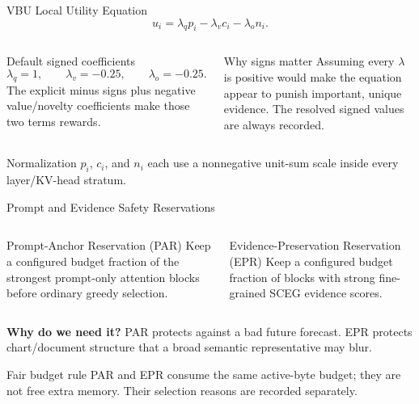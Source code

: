 \documentclass[aspectratio=169,10pt]{beamer}
\newcommand{\whylabel}{\textbf{Why do we need it?}}
\begin{document}
\begin{frame}{VBU Local Utility Equation}
\small
\[
u_i=\lambda_qp_i-\lambda_vc_i-\lambda_on_i.
\]
\begin{columns}[T,onlytextwidth]
\begin{block}{Default signed coefficients}
\[
\lambda_q=1,\qquad \lambda_v=-0.25,\qquad \lambda_o=-0.25.
\]
The explicit minus signs plus negative value/novelty coefficients make those two terms rewards.
\end{block}
\begin{alertblock}{Why signs matter}
Assuming every $\lambda$ is positive would make the equation appear to punish important, unique
evidence. The resolved signed values are always recorded.
\end{alertblock}
\end{columns}
\begin{exampleblock}{Normalization}
$p_i$, $c_i$, and $n_i$ each use a nonnegative unit-sum scale inside every layer/KV-head stratum.
\end{exampleblock}
\end{frame}

\begin{frame}{Prompt and Evidence Safety Reservations}
\small
\begin{columns}[T,onlytextwidth]
\begin{block}{Prompt-Anchor Reservation (PAR)}
Keep a configured budget fraction of the strongest prompt-only attention blocks before ordinary
greedy selection.
\end{block}
\begin{block}{Evidence-Preservation Reservation (EPR)}
Keep a configured budget fraction of blocks with strong fine-grained SCEG evidence scores.
\end{block}
\end{columns}
\begin{alertblock}{\whylabel}
PAR protects against a bad future forecast. EPR protects chart/document structure that a broad
semantic representative may blur.
\end{alertblock}
\begin{exampleblock}{Fair budget rule}
PAR and EPR consume the same active-byte budget; they are not free extra memory. Their selection
reasons are recorded separately.
\end{exampleblock}
\end{frame}
\end{document}
